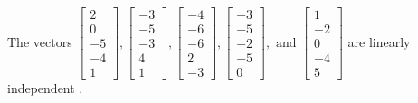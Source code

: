 \begin{exercise}
\begin{exerciseStatement}
  \end{exerciseStatement}
  \begin{exerciseAnswer}
   The vectors \(\left[\begin{array}{r}
2 \\
0 \\
-5 \\
-4 \\
1
\end{array}\right] , \left[\begin{array}{r}
-3 \\
-5 \\
-3 \\
4 \\
1
\end{array}\right] , \left[\begin{array}{r}
-4 \\
-6 \\
-6 \\
2 \\
-3
\end{array}\right] , \left[\begin{array}{r}
-3 \\
-5 \\
-2 \\
-5 \\
0
\end{array}\right] , \text{ and } \left[\begin{array}{r}
1 \\
-2 \\
0 \\
-4 \\
5
\end{array}\right]\) are 
  	 linearly independent  .
  


  \end{exerciseAnswer}
\end{exercise}